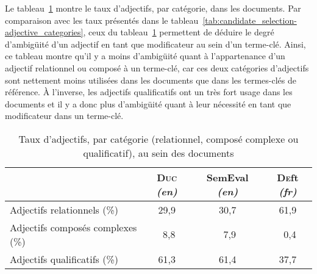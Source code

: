       Le tableau~\ref{tab:candidate_selection-adjective_categories_in_documents}
      montre le taux d'adjectifs, par catégorie, dans les documents. Par
      comparaison avec les taux présentés dans le
      tableau~\ref{tab:candidate_selection-adjective_categories}, ceux du
      tableau~\ref{tab:candidate_selection-adjective_categories_in_documents}
      permettent de déduire le degré d'ambigüité d'un adjectif en tant que
      modificateur au sein d'un terme-clé. Ainsi, ce tableau montre qu'il y a
      moins d'ambigüité quant à l'appartenance d'un adjectif relationnel ou
      composé à un terme-clé, car ces deux catégories d'adjectifs sont nettement
      moins utilisées dans les documents que dans les termes-clés de référence.
      À l'inverse, les adjectifs qualificatifs ont un très fort usage dans les
      documents et il y a donc plus d'ambigüité quant à leur nécessité en tant
      que modificateur dans un terme-clé.
      \begin{table}[!h]
        \centering
          \begin{tabular}{l|ccc}
            \toprule
            & \textbf{\textsc{Duc}} \textit{(en)} & \textbf{SemEval} \textit{(en)} & \textbf{\textsc{De}ft} \textit{(fr)}\\
            \hline
            Adjectifs relationnels \hfill(\%) & 29,9 & 30,7 & 61,9\\
            Adjectifs composés complexes \hfill(\%) & $~~$8,8 & $~~$7,9 & $~~$0,4\\
            Adjectifs qualificatifs \hfill(\%) & 61,3 & 61,4 & 37,7\\
            \bottomrule
        \end{tabular}
        \caption{Taux d'adjectifs, par catégorie (relationnel, composé complexe
                 ou qualificatif), au sein des documents}
                 \label{tab:candidate_selection-adjective_categories_in_documents}
      \end{table}

